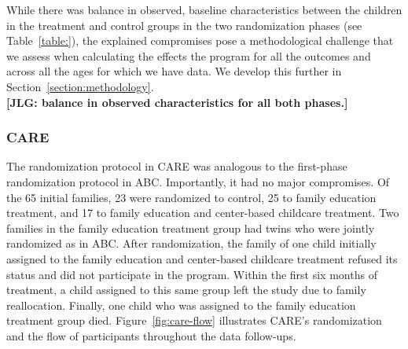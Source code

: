 \noindent While there was balance in observed, baseline characteristics between the children in the treatment and control groups in the two randomization phases (see Table~\ref{table:}), the explained compromises pose a methodological challenge that we assess when calculating the effects the program for all the outcomes and across all the ages for which we have data. We develop this further in Section~\ref{section:methodology}.\\

\noindent \textbf{[JLG: balance in observed characteristics for all both phases.]}\\

\subsubsection{CARE}

\noindent 
The randomization protocol in CARE was analogous to the first-phase randomization protocol in ABC. Importantly, it had no major compromises. Of the 65 initial families, 23 were randomized to control, 25 to family education treatment, and 17 to family education and center-based childcare treatment. Two families in the family education treatment group had twins who were jointly randomized as in ABC. After randomization, the family of one child initially assigned to the family education and center-based childcare treatment refused its status and did not participate in the program. Within the first six months of treatment, a child assigned to this same group left the study due to family reallocation. Finally, one child who was assigned to the family education treatment group died. Figure~\ref{fig:care-flow} illustrates CARE's randomization and the flow of participants throughout the data follow-ups.\\

